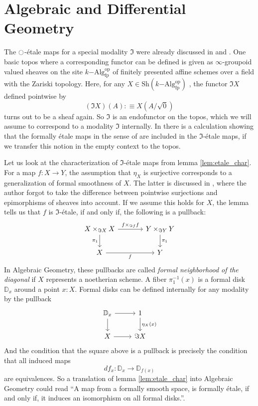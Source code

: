 \documentclass[9pt,twosided]{amsart}
\newcommand{\bD}{\mathbb D}
\begin{document}
\section{Algebraic and Differential Geometry}

The ${\ocircle}$-étale maps for a special modality $\Im$ were already discussed in \cite{wellen-thesis} and \cite{wellen-cartan-geometry}.
One basic topos where a corresponding functor can be defined is given as $\infty$-groupoid valued sheaves on the site $k\mathrm{-Alg}^{\mathrm{op}}_{\mathrm{fp}}$ of finitely presented affine schemes over a field with the Zariski topology. Here, for any $X\in\mathrm{Sh}(k\mathrm{-Alg}^\mathrm{op}_{\mathrm{fp}})$ , the functor $\Im X$ defined pointwise by
\[ (\Im X)(A):\equiv X(A/\sqrt{0})\]
turns out to be a sheaf again. So $\Im$ is an endofunctor on the topos, which we will assume to correspond to a modality $\Im$ internally.
In \cite[Section 4.4]{wellen-thesis} there is a calculation showing that the formally étale maps in the sense of \cite[§ 17]{GrothendieckDieudonne} are included in the $\Im$-étale maps, if we transfer this notion in the empty context to the topos.

Let us look at the characterization of $\Im$-étale maps from lemma \ref{lem:etale_char}.
For a map $f:X\to Y$, the assumption that $\eta_X$ is surjective corresponds to a generalization of formal smoothness of $X$.
The latter is discussed in \cite[Section 4.4]{wellen-thesis}, where the author forgot to take the difference between pointwise surjections and epimorphisms of sheaves into account.
If we assume this holds for $X$, the lemma tells us that $f$ is $\Im$-étale, if and only if, the following is a pullback:
\begin{equation*}
\begin{tikzcd}[column sep=large]
X\times_{\Im X} X \arrow[d,swap,"\pi_1"] \arrow[r,"{f\times_{\Im f} f}"] & Y\times_{\Im Y} Y \arrow[d,"\pi_1"] \\
X \arrow[r,swap,"f"] & Y
\end{tikzcd}
\end{equation*}
In Algebraic Geometry, these pullbacks are called \emph{formal neighborhood of the diagonal} if $X$ represents a noetherian scheme.
A fiber $\pi_1^{-1}(x)$ is a formal disk $\bD_x$ around a point $x:X$.
Formal disks can be defined internally for any modality by the pullback
\begin{equation*}
  \begin{tikzcd}
    \bD_x\arrow[r]\arrow[d] & 1\arrow[d, "\eta_X(x)"] \\
    X \arrow[r] & \Im X
  \end{tikzcd}
\end{equation*}
And the condition that the square above is a pullback is precisely the condition that all induced maps
\[ df_x:\bD_x\to\bD_{f(x)}\]
are equivalences. So a translation of lemma \ref{lem:etale_char} into Algebraic Geometry could read ``A map from a formally smooth space, is formally étale, if and only if, it induces an isomorphism on all formal disks.''.
\end{document}
